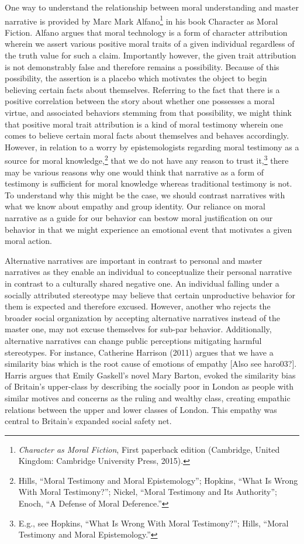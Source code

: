 \documentclass[phdthesis,12pt,final]{wuthesis}
\theoremstyle{definition}
\theoremstyle{definition}
\theoremstyle{definition}
\theoremstyle{definition}
\theoremstyle{remark}
\begin{document}
One way to understand the relationship between moral understanding and master narrative is provided by Marc Mark Alfano\footnote{\emph{Character as Moral Fiction}, First paperback edition (Cambridge, United Kingdom: Cambridge University Press, 2015).} in his book Character as Moral Fiction. Alfano argues that moral technology is a form of character attribution wherein we assert various positive moral traits of a given individual regardless of the truth value for such a claim. Importantly however, the given trait attribution is not demonstrably false and therefore remains a possibility. Because of this possibility, the assertion is a placebo which motivates the object to begin believing certain facts about themselves. Referring to the fact that there is a positive correlation between the story about whether one possesses a moral virtue, and associated behaviors stemming from that possibility, we might think that positive moral trait attribution is a kind of moral testimony wherein one comes to believe certain moral facts about themselves and behaves accordingly. However, in relation to a worry by epistemologists regarding moral testimony as a source for moral knowledge,\footnote{Hills, {``Moral Testimony and Moral Epistemology''}; Hopkins, {``What {Is Wrong With Moral Testimony}?''}; Nickel, {``Moral {Testimony} and Its {Authority}''}; Enoch, {``A {Defense} of {Moral Deference}.''}} that we do not have any reason to trust it,\footnote{E.g., see Hopkins, {``What {Is Wrong With Moral Testimony}?''}; Hills, {``Moral Testimony and Moral Epistemology.''}} there may be various reasons why one would think that narrative as a form of testimony is sufficient for moral knowledge whereas traditional testimony is not. To understand why this might be the case, we should contrast narratives with what we know about empathy and group identity. Our reliance on moral narrative as a guide for our behavior can bestow moral justification on our behavior in that we might experience an emotional event that motivates a given moral action.

Alternative narratives are important in contrast to personal and master narratives as they enable an individual to conceptualize their personal narrative in contrast to a culturally shared negative one. An individual falling under a socially attributed stereotype may believe that certain unproductive behavior for them is expected and therefore excused. However, another who rejects the broader social organization by accepting alternative narratives instead of the master one, may not excuse themselves for sub-par behavior. Additionally, alternative narratives can change public perceptions mitigating harmful stereotypes. For instance, Catherine Harrison (2011) argues that we have a similarity bias which is the root cause of emotions of empathy {[}Also see haro03?{]}. Harris argues that Emily Gaskell's novel Mary Barton, evoked the similarity bias of Britain's upper-class by describing the socially poor in London as people with similar motives and concerns as the ruling and wealthy class, creating empathic relations between the upper and lower classes of London. This empathy was central to Britain's expanded social safety net.
\end{document}
